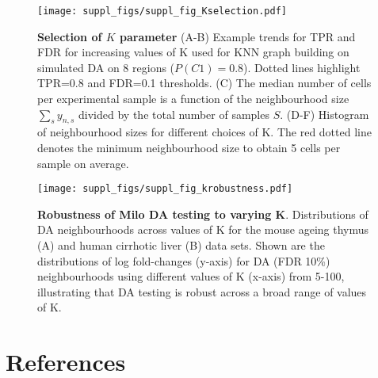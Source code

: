 \documentclass[
]{article}
\begin{document}
\begin{figure}
\centering
\texttt{[image: suppl\_figs/suppl\_fig\_Kselection.pdf]}
\caption{\label{fig:sup-fig-Kselection}\textbf{Selection of \(K\) parameter}
(A-B) Example trends for TPR and FDR for increasing values of K used for KNN graph building on simulated DA on 8 regions (\(P(C1) = 0.8\)). Dotted lines highlight TPR=0.8 and FDR=0.1 thresholds. (C) The median number of cells per experimental sample is a function of the neighbourhood size \(\sum_s{y_{n,s}}\) divided by the total number of samples \(S\). (D-F) Histogram of neighbourhood sizes for different choices of K. The red dotted line denotes the minimum neighbourhood size to obtain 5 cells per sample on average.}
\end{figure}




\begin{figure}
\centering
\texttt{[image: suppl\_figs/suppl\_fig\_krobustness.pdf]}
\caption{\label{fig:sup-fig-robustness}\textbf{Robustness of Milo DA testing to varying K}. Distributions of DA neighbourhoods across values of K for the mouse ageing thymus (A) and human cirrhotic liver (B) data sets. Shown are the distributions of log fold-changes (y-axis) for DA (FDR 10\%) neighbourhoods using different values of K (x-axis) from 5-100, illustrating that DA testing is robust across a broad range of values of K.}
\end{figure}



\newpage

\hypertarget{references}{%
\section*{References}\label{references}}
\end{document}
